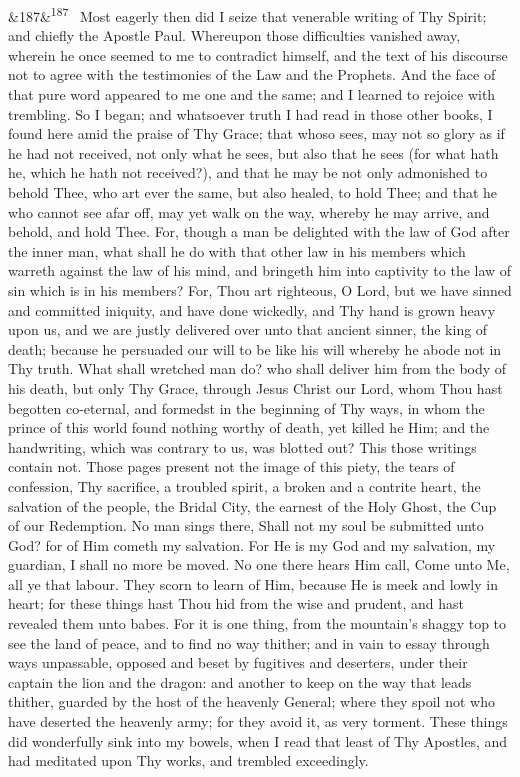 \documentclass[12pt]{article}
\newcommand{\para}[1][]{\par\noindent\ifx&#1&\else\textsuperscript{\footnotesize #1}~\fi}
\begin{document}
\para[187] Most eagerly then did I seize that venerable writing of Thy Spirit; and chiefly the Apostle Paul. Whereupon those difficulties vanished away, wherein he once seemed to me to contradict himself, and the text of his discourse not to agree with the testimonies of the Law and the Prophets. And the face of that pure word appeared to me one and the same; and I learned to rejoice with trembling. So I began; and whatsoever truth I had read in those other books, I found here amid the praise of Thy Grace; that whoso sees, may not so glory as if he had not received, not only what he sees, but also that he sees (for what hath he, which he hath not received?), and that he may be not only admonished to behold Thee, who art ever the same, but also healed, to hold Thee; and that he who cannot see afar off, may yet walk on the way, whereby he may arrive, and behold, and hold Thee. For, though a man be delighted with the law of God after the inner man, what shall he do with that other law in his members which warreth against the law of his mind, and bringeth him into captivity to the law of sin which is in his members? For, Thou art righteous, O Lord, but we have sinned and committed iniquity, and have done wickedly, and Thy hand is grown heavy upon us, and we are justly delivered over unto that ancient sinner, the king of death; because he persuaded our will to be like his will whereby he abode not in Thy truth. What shall wretched man do? who shall deliver him from the body of his death, but only Thy Grace, through Jesus Christ our Lord, whom Thou hast begotten co-eternal, and formedst in the beginning of Thy ways, in whom the prince of this world found nothing worthy of death, yet killed he Him; and the handwriting, which was contrary to us, was blotted out? This those writings contain not. Those pages present not the image of this piety, the tears of confession, Thy sacrifice, a troubled spirit, a broken and a contrite heart, the salvation of the people, the Bridal City, the earnest of the Holy Ghost, the Cup of our Redemption. No man sings there, Shall not my soul be submitted unto God? for of Him cometh my salvation. For He is my God and my salvation, my guardian, I shall no more be moved. No one there hears Him call, Come unto Me, all ye that labour. They scorn to learn of Him, because He is meek and lowly in heart; for these things hast Thou hid from the wise and prudent, and hast revealed them unto babes. For it is one thing, from the mountain's shaggy top to see the land of peace, and to find no way thither; and in vain to essay through ways unpassable, opposed and beset by fugitives and deserters, under their captain the lion and the dragon: and another to keep on the way that leads thither, guarded by the host of the heavenly General; where they spoil not who have deserted the heavenly army; for they avoid it, as very torment. These things did wonderfully sink into my bowels, when I read that least of Thy Apostles, and had meditated upon Thy works, and trembled exceedingly.
\end{document}
